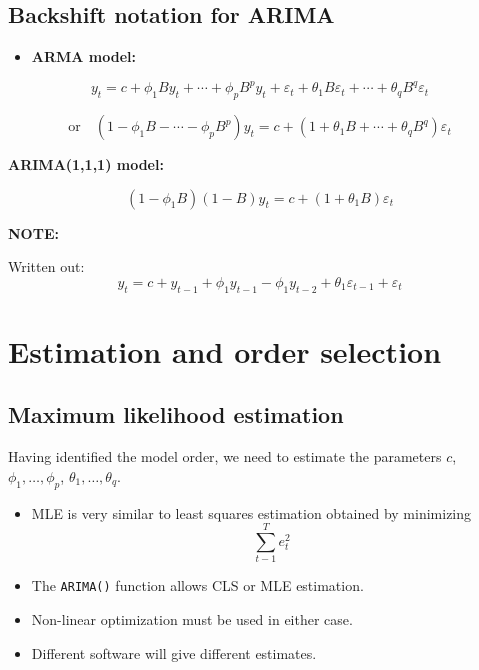 \documentclass[]{book}
\providecommand{\tightlist}{%
  \setlength{\itemsep}{0pt}\setlength{\parskip}{0pt}}
\begin{document}
\hypertarget{backshift-notation-for-arima}{%
\subsection{Backshift notation for ARIMA}\label{backshift-notation-for-arima}}

\begin{itemize}
\tightlist
\item
  \textbf{ARMA model:}
\end{itemize}

\[y_{t} = c + \phi_{1}By_{t} + \cdots + \phi_pB^py_{t}
           + \varepsilon_{t} + \theta_{1}B\varepsilon_{t} + \cdots + \theta_qB^q\varepsilon_{t}\]

\[\text{or}\quad
      (1-\phi_1B - \cdots - \phi_p B^p) y_t = c + (1 + \theta_1 B + \cdots + \theta_q B^q)\varepsilon_t\]

\textbf{ARIMA(1,1,1) model:}

\[(1 - \phi_{1} B) (1 - B) y_{t} =  c + (1 + \theta_{1} B) \varepsilon_{t}\]

\textbf{NOTE:}

Written out:
\[y_t = c + y_{t-1} + \phi_1 y_{t-1}- \phi_1 y_{t-2} + \theta_1\varepsilon_{t-1} + \varepsilon_t\]

\hypertarget{estimation-and-order-selection}{%
\section{Estimation and order selection}\label{estimation-and-order-selection}}

\hypertarget{maximum-likelihood-estimation}{%
\subsection{Maximum likelihood estimation}\label{maximum-likelihood-estimation}}

Having identified the model order, we need to estimate the parameters \(c\), \(\phi_1,\dots,\phi_p\), \(\theta_1,\dots,\theta_q\).

\begin{itemize}
\tightlist
\item
  MLE is very similar to least squares estimation obtained by minimizing
  \[\sum_{t-1}^T e_t^2\]
\item
  The \texttt{ARIMA()} function allows CLS or MLE estimation.
\item
  Non-linear optimization must be used in either case.
\item
  Different software will give different estimates.
\end{itemize}
\end{document}

